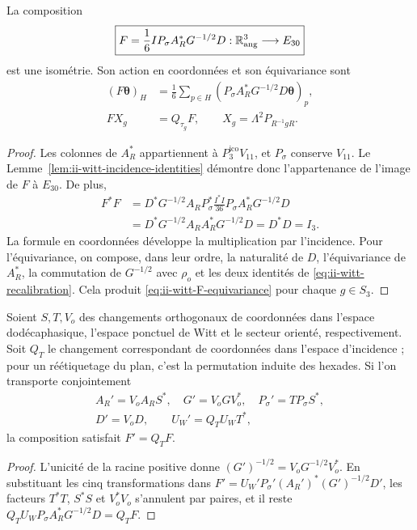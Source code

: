 \begin{theorem}
\label{thm:ii-witt-angular-transport}
La composition
\begin{equation}
 \boxed{F=\frac16 I P_\sigma A_R^*G^{-1/2}D:
        \mathbb R^3_{\rm ang}\longrightarrow E_{30}}
 \label{eq:ii-witt-F}
\end{equation}
est une isométrie. Son action en coordonnées et son équivariance sont
\begin{align}
 (F\boldsymbol\theta)_H
 &=\frac16\sum_{p\in H}
       (P_\sigma A_R^*G^{-1/2}D\boldsymbol\theta)_p,
       \label{eq:ii-witt-F-coordinates}\\
 F X_g&=Q_{\tau_g}F,
 \qquad X_g=\Lambda^2P_{R^{-1}gR}.
       \label{eq:ii-witt-F-equivariance}
\end{align}
\end{theorem}
\begin{proof}
Les colonnes de \(A_R^*\) appartiennent à \(P_3^{\mathrm{ico}}V_{11}\), et
\(P_\sigma\) conserve \(V_{11}\). Le
Lemme~\ref{lem:ii-witt-incidence-identities} démontre donc
l’appartenance de l’image de \(F\) à \(E_{30}\). De plus,
\begin{align*}
 F^*F
 &=D^*G^{-1/2}A_RP_\sigma^*
       \frac{I^*I}{36}P_\sigma A_R^*G^{-1/2}D\\
 &=D^*G^{-1/2}A_RA_R^*G^{-1/2}D
  =D^*D=I_3.
\end{align*}
La formule en coordonnées développe la multiplication par l’incidence.
Pour l’équivariance, on compose, dans leur ordre, la naturalité de \(D\),
l’équivariance de \(A_R^*\), la commutation de \(G^{-1/2}\) avec
\(\rho_o\) et les deux identités de
\eqref{eq:ii-witt-recalibration}. Cela produit
\eqref{eq:ii-witt-F-equivariance} pour chaque \(g\in S_3\).
\end{proof}

\begin{proposition}
\label{prop:ii-witt-gauge-covariance}
Soient \(S,T,V_o\) des changements orthogonaux de coordonnées dans l’espace
dodécaphasique, l’espace ponctuel de Witt et le secteur orienté,
respectivement. Soit \(Q_T\) le changement correspondant de coordonnées
dans l’espace d’incidence ; pour un réétiquetage du plan, c’est la
permutation induite des hexades. Si l’on transporte conjointement
\[
\begin{gathered}
 A_R'=V_oA_RS^*,\quad G'=V_oGV_o^*,\quad
 P_\sigma'=TP_\sigma S^*,\\
 D'=V_oD,\qquad U_W'=Q_TU_WT^*,
\end{gathered}
\]
la composition satisfait \(F'=Q_TF\).
\end{proposition}
\begin{proof}
L’unicité de la racine positive donne
\((G')^{-1/2}=V_oG^{-1/2}V_o^*\). En substituant les cinq
transformations dans
\(F'=U_W'P_\sigma'(A_R')^*(G')^{-1/2}D'\), les facteurs
\(T^*T\), \(S^*S\) et \(V_o^*V_o\) s’annulent par paires, et il reste
\(Q_TU_WP_\sigma A_R^*G^{-1/2}D=Q_TF\).
\end{proof}

